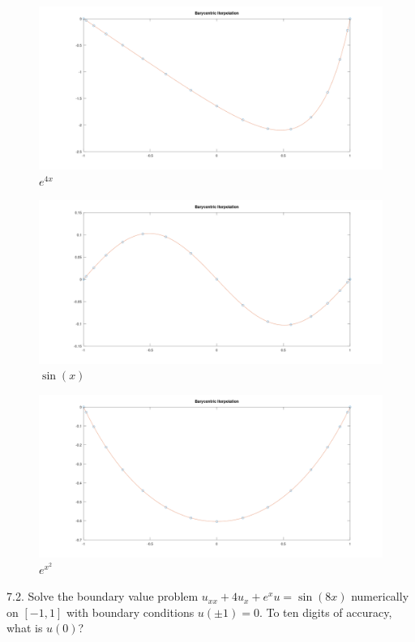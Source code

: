 \documentclass[12pt]{article}
\begin{document}
\begin{figure}[htp]
\centering
\includegraphics[scale=0.2]{7_1exp.PNG}
\caption{$e^{4x}$}
\end{figure}
\begin{figure}[htp]
\centering
\includegraphics[scale=0.2]{7_1sin.PNG}
\caption{$\sin(x)$}
\end{figure}
\begin{figure}[htp]
\centering
\includegraphics[scale=0.2]{7_1exp2.PNG}
\caption{$e^{x^2}$}
\end{figure}

\newpage

\newpage

7.2. Solve the boundary value problem $u_{xx}+4u_x+e^xu=\sin(8x)$ numerically on $[-1,1]$ with boundary conditions
$u(\pm1)=0$. To ten digits of accuracy, what is $u(0)$?\\\\
\end{document}
